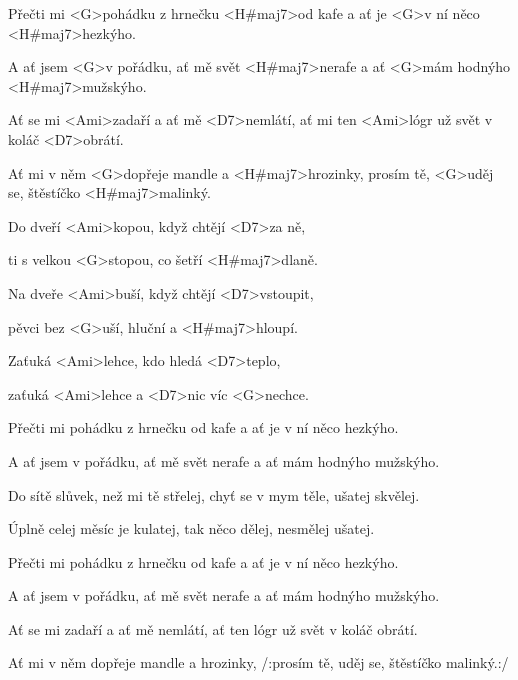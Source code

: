 

\zs
Přečti mi <G>pohádku z hrnečku <H#maj7>od kafe
a ať je <G>v ní něco <H#maj7>hezkýho.

A ať jsem <G>v pořádku, ať mě svět <H#maj7>nerafe
a ať <G>mám hodnýho <H#maj7>mužskýho.

Ať se mi <Ami>zadaří a ať mě <D7>nemlátí,
ať mi ten <Ami>lógr už svět v koláč <D7>obrátí.

Ať mi v něm <G>dopřeje mandle a <H#maj7>hrozinky,
prosím tě, <G>uděj se, štěstíčko <H#maj7>malinký.
\ks

\zr
Do dveří <Ami>kopou, když chtějí <D7>za ně,

ti s velkou <G>stopou, co šetří <H#maj7>dlaně.

Na dveře <Ami>buší, když chtějí <D7>vstoupit,

pěvci bez <G>uší, hluční a <H#maj7>hloupí.

Zaťuká <Ami>lehce, kdo hledá <D7>teplo,

zaťuká <Ami>lehce a <D7>nic víc <G>nechce.
\kr

\zs
Přečti mi pohádku z hrnečku od kafe
a ať je v ní něco hezkýho.

A ať jsem v pořádku, ať mě svět nerafe
a ať mám hodnýho mužskýho.

Do sítě slůvek, než mi tě střelej,
chyť se v mym těle, ušatej skvělej.

Úplně celej měsíc je kulatej,
tak něco dělej, nesmělej ušatej.
\ks

\zr \kr

\zs
Přečti mi pohádku z hrnečku od kafe
a ať je v ní něco hezkýho.

A ať jsem v pořádku, ať mě svět nerafe
a ať mám hodnýho mužskýho.

Ať se mi zadaří a ať mě nemlátí,
ať ten lógr už svět v koláč obrátí.

Ať mi v něm dopřeje mandle a hrozinky,
/:prosím tě, uděj se, štěstíčko malinký.:/
\ks

\kp
